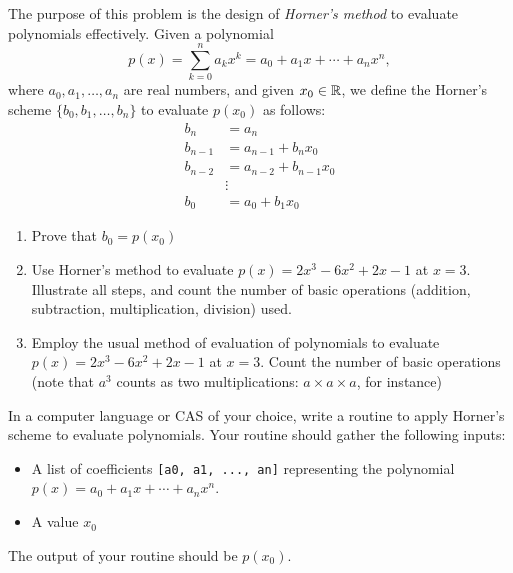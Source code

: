 \begin{problem}[Basic]
The purpose of this problem is the design of \emph{Horner's method} to evaluate polynomials effectively.  Given a polynomial
\begin{equation*}
p(x) = \sum_{k=0}^n a_k x^k = a_0 + a_1 x + \dotsb + a_n x^n,
\end{equation*}
where $a_0, a_1, \dotsc, a_n$ are real numbers, and given $x_0 \in \mathbb{R}$, we define the Horner's scheme $\{ b_0, b_1, \dotsc, b_n \}$ to evaluate $p(x_0)$ as follows:
\begin{align*}
b_n &= a_n \\
b_{n-1} &= a_{n-1} + b_n x_0 \\
b_{n-2} &= a_{n-2} + b_{n-1} x_0 \\
&\vdots \\
b_0 &= a_0 + b_1 x_0
\end{align*}
\begin{enumerate}
	\item Prove that $b_0 = p(x_0)$
	\item Use Horner's method to evaluate $p(x) = 2x^3 - 6x^2 +2x -1$ at $x=3$.  Illustrate all steps, and count the number of basic operations (addition, subtraction, multiplication, division) used.
	\item Employ the usual method of evaluation of polynomials to evaluate $p(x) = 2x^3 - 6x^2 +2x -1$ at $x=3$.  Count the number of basic operations (note that $a^3$ counts as two multiplications: $a \times a \times a$, for instance)
\end{enumerate}
\end{problem}

\begin{problem}[CAS]
In a computer language or CAS of your choice, write a routine to apply Horner's scheme to evaluate polynomials.  Your routine should gather the following inputs:
	\begin{itemize}
		\item A list of coefficients \texttt{[a0, a1, ..., an]} representing the polynomial $p(x)=a_0+a_1 x+\dotsb+a_n x^n$.
		\item A value $x_0$
	\end{itemize}
	The output of your routine should be $p(x_0)$.
\end{problem}

